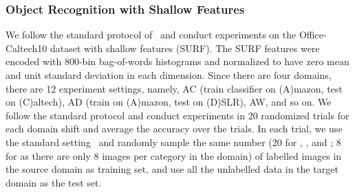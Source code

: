 \documentclass[letterpaper]{article}
\begin{document}
\begin{table*}\Large
\centering
{}
\caption{\small Object recognition accuracies of all 12 domain shifts on the Office-Caltech10 dataset~\cite{gfk} with SURF features, following the protocol of~\cite{gfk,sasb,gopalan-iccv11,ref:kulis_cvpr11,saenko2010adapting}.}
\label{tab:result}
\vspace{-0.1in}
\end{table*}

\subsubsection{Object Recognition with Shallow Features}  
We follow the standard protocol of~\cite{gfk,sasb,gopalan-iccv11,ref:kulis_cvpr11,saenko2010adapting} and conduct experiments on the Office-Caltech10 dataset with shallow features (SURF).
The SURF features were encoded with 800-bin bag-of-words histograms and normalized to have zero mean and unit standard deviation in each dimension.  Since there are four domains, there are 12 experiment settings, namely, AC (train classifier on (A)mazon, test on (C)altech), AD (train on (A)mazon, test on (D)SLR), AW, and so on. We follow the standard protocol and conduct experiments in 20 randomized trials for each domain shift and average the accuracy over the trials. In each trial, we use the standard setting~\cite{gfk,sasb,gopalan-iccv11,ref:kulis_cvpr11,saenko2010adapting} and randomly sample the same number (20 for , , and ; 8 for  as there are only 8 images per category in the  domain) of labelled images in the source domain as training set, and use all the unlabelled data in the target domain as the test set. 
\end{document}
